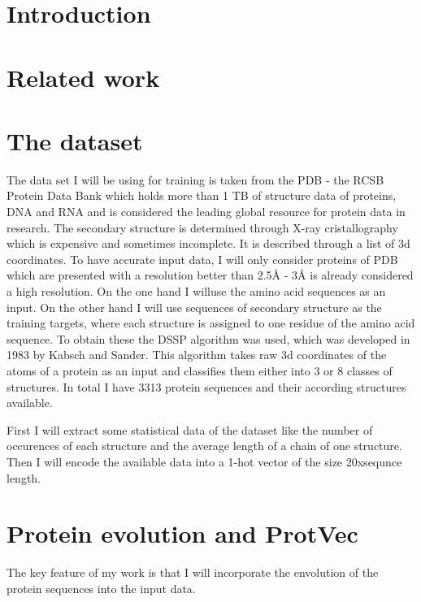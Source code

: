 \documentclass{article}
\begin{document}
\section{Introduction}

\section{Related work}

\section{The dataset}
The data set I will be using for training is taken from the PDB - the RCSB Protein Data Bank \cite{pdb} which holds more than 1 TB of structure data of proteins, DNA and RNA and is considered the leading global resource for protein data in research. The secondary structure is determined through X-ray cristallography which is expensive and sometimes incomplete. It is described through a list of 3d coordinates. To have accurate input data, I will only consider proteins of PDB which are presented with a resolution better than 2.5Å - 3Å is already considered a high resolution.
On the one hand I willuse the amino acid sequences as an input. On the other hand I will use sequences of secondary structure as the training targets, where each structure is assigned to one residue of the amino acid sequence. To obtain these the DSSP algorithm was used, which was developed in 1983 by Kabsch and Sander. This algorithm takes raw 3d coordinates of the atoms of a protein as an input and classifies them either into 3 or 8 classes of structures.
In total I have 3313 protein sequences and their according structures available. 

First I will extract some statistical data of the dataset like the number of occurences of each structure and the average length of a chain of one structure. Then I will encode the available data into a 1-hot vector of the size 20xsequnce length.

\section{Protein evolution and ProtVec}
The key feature of my work is that I will incorporate the envolution of the protein sequences into the input data.
\end{document}
